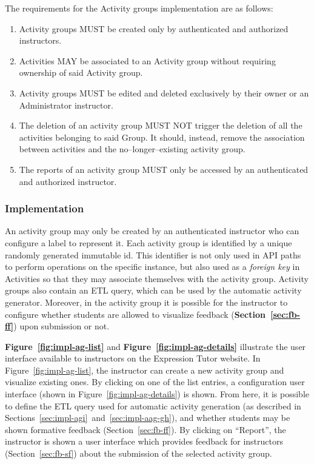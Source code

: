 \begin{chapterBody}
The requirements for the Activity groups implementation are as follows:

\begin{enumerate}
    \item Activity groups MUST be created only by authenticated and authorized
instructors.
    \item Activities MAY be associated to an Activity group without requiring
ownership of said Activity group.
    \item Activity groups MUST be edited and deleted exclusively by their owner
or an Administrator instructor.
    \item The deletion of an activity group MUST NOT trigger the deletion of
all the activities belonging to said Group. It should, instead, remove
the association between activities and the no–longer–existing activity group.
    \item The reports of an activity group MUST only be accessed by an
authenticated and authorized instructor.
\end{enumerate}

\subsubsection*{Implementation}

An activity group may only be created by an authenticated instructor who can
configure a label to represent it. Each activity group is identified by a
unique randomly generated immutable id. This identifier is not only used in API
paths to perform operations on the specific instance, but also used as a
\textit{foreign key} in Activities so that they may associate themselves with 
the activity group.
Activity groups also contain an ETL query, which can be used by the automatic
activity generator. Moreover, in the activity group it is possible for the
instructor to configure whether students are allowed to visualize
feedback (\textbf{Section~\ref{sec:fb-ff}}) upon submission or not.

\textbf{Figure~\ref{fig:impl-ag-list}} and
\textbf{Figure~\ref{fig:impl-ag-details}} illustrate the user interface available
to instructors on the Expression Tutor website. In Figure~\ref{fig:impl-ag-list},
the instructor can create a new activity group and visualize existing ones.
By clicking on one of the list entries, a configuration user interface
(shown in Figure~\ref{fig:impl-ag-details}) is shown. From here, it is possible
to define the ETL query used for automatic activity generation (as described
in Sections~\ref{sec:impl-agi}~and~\ref{sec:impl-aag-gh}), and whether students
may be shown formative feedback (Section~\ref{sec:fb-ff}).
By clicking on ``Report'', the instructor is shown a user interface which
provides feedback for instructors (Section~\ref{sec:fb-sf}) about the submission
of the selected activity group.


\end{chapterBody}
